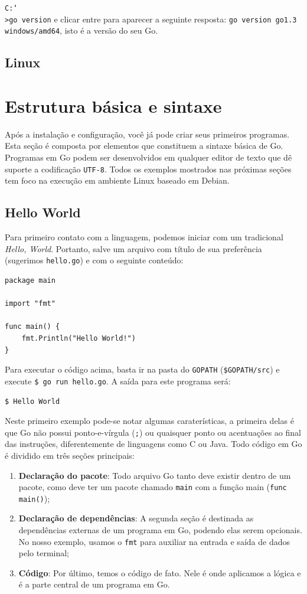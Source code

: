 \documentclass{SBCbookchapter}
\begin{document}
\texttt{C:\char`\\>go version} e clicar entre para aparecer a seguinte resposta: \texttt{go version go1.3 windows/amd64}, isto é a versão do seu Go. 
\subsection{Linux}

\section{Estrutura básica e sintaxe}

Após a instalação e configuração, você já pode criar seus primeiros programas. Esta seção é composta por elementos que constituem a sintaxe básica de Go. Programas em Go podem ser desenvolvidos em qualquer editor de texto que dê suporte a codificação \texttt{UTF-8}. Todos os exemplos mostrados nas próximas seções tem foco na execução em ambiente Linux baseado em Debian.

\subsection{Hello World}

Para primeiro contato com a linguagem, podemos iniciar com um tradicional \textit{Hello, World}. Portanto, salve um arquivo com título de sua preferência (sugerimos \texttt{hello.go}) e com o seguinte conteúdo:

\begin{lstlisting}
package main

import "fmt"

func main() {
	fmt.Println("Hello World!")
}
\end{lstlisting}

Para executar o código acima, basta ir na pasta do \texttt{GOPATH} (\texttt{\$GOPATH/src}) e execute \texttt{\$ go run hello.go}. A saída para este programa será:

\texttt{\$ Hello World}

Neste primeiro exemplo pode-se notar algumas caraterísticas, a primeira delas é que Go não possui ponto-e-vírgula (\texttt{;}) ou quaisquer ponto ou acentuações ao final das instruções, diferentemente de linguagens como C ou Java. Todo código em Go é dividido em três seções principais: 

\begin{enumerate}
	\item \textbf{Declaração do pacote}: Todo arquivo Go tanto deve existir dentro de um pacote, como deve ter um pacote chamado \texttt{main} com a função main (\texttt{func main()});
	\item \textbf{Declaração de dependências}: A segunda seção é destinada as dependências externas de um programa em Go, podendo elas serem opcionais. No nosso exemplo, usamos o \texttt{fmt} para auxiliar na entrada e saída de dados pelo terminal;
	\item \textbf{Código}: Por último, temos o código de fato. Nele é onde aplicamos a lógica e é a parte central de um programa em Go.
\end{enumerate}
\end{document}
